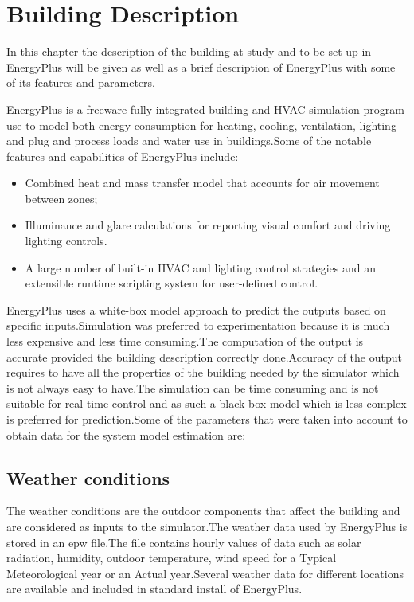 \documentclass[a4paper,12pt]{article}
\numberwithin{equation}{section}
\begin{document}
\newpage
\section{Building Description}
In this chapter the description of the building at study and to be set up in EnergyPlus will be given as well as a brief description of EnergyPlus with some of its features and parameters.

EnergyPlus is a freeware fully integrated building and HVAC simulation program  use to model both energy consumption for heating, cooling, ventilation, lighting and plug and process loads and water use in buildings.Some of the notable features and capabilities of EnergyPlus include:
\begin{itemize}
  \item Combined heat and mass transfer model that accounts for air movement between zones;
  \item Illuminance and glare calculations for reporting visual comfort and driving lighting controls.
  \item A large number of built-in HVAC and lighting control strategies and an extensible runtime scripting system for user-defined control.
\end{itemize}

\noindent
EnergyPlus uses a white-box model approach to predict the outputs based on specific inputs.Simulation was preferred to experimentation because it is much less expensive and less time consuming.The computation of the output is accurate provided the building description correctly done.Accuracy of the output requires to have all the properties of the building needed by the simulator which is not always easy to have.The simulation can be time consuming and is not suitable for real-time control and as such a black-box model which is less complex is preferred for prediction.Some of the parameters that were taken into account to obtain data for the system model estimation are:

\subsection{Weather conditions}
The weather conditions are the outdoor components that affect the building and are considered as inputs to the simulator.The weather data used by EnergyPlus is stored in an epw file.The file contains hourly values of data such as solar radiation, humidity, outdoor temperature, wind speed for a Typical Meteorological year or an Actual year.Several weather data for different locations are available and included in standard install of EnergyPlus. 
\end{document}
